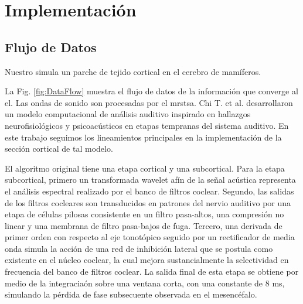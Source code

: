 



\section{Implementación}

\subsection{Flujo de Datos}

Nuestro  simula un parche de tejido cortical en el cerebro de mamíferos. 

La Fig. \ref{fig:DataFlow} muestra el flujo de datos de la información que converge al \gls{el}. Las ondas de sonido son procesadas por el \gls{mrstsa}. Chi T. et al. \cite{chi_2005} desarrollaron un modelo computacional de análisis auditivo inspirado en hallazgos neurofisiológicos y psicoacústicos en etapas tempranas del sistema auditivo. En este trabajo seguimos los lineamientos principales en la implementación de la sección cortical de tal modelo.


El algoritmo original tiene una etapa cortical y una subcortical. Para la etapa subcortical, primero un transformada wavelet afín de la señal acústica representa el análisis espectral realizado por el banco de filtros coclear. Segundo, las salidas de los filtros cocleares son transducidos en patrones del nervio auditivo por una etapa de células pilosas consistente en un filtro pasa-altos, una compresión no linear y una membrana de filtro pasa-bajos de fuga. Tercero, una derivada de primer orden con respecto al eje tonotópico seguido por un rectificador de media onda simula la acción de una red de inhibición lateral que se postula como existente en el núcleo coclear, la cual mejora sustancialmente la selectividad en frecuencia del banco de filtros coclear. La salida final de esta etapa se obtiene por medio de la integraciaón sobre una ventana corta, con una constante de 8 ms, simulando la pérdida de fase subsecuente observada en el mesencéfalo.

